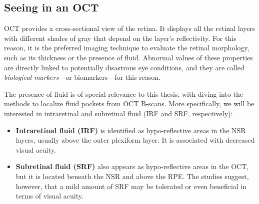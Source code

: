 
\subsection{Seeing in an OCT}
OCT provides a cross-sectional view of the retina. It displays all the retinal layers with different shades of gray that depend on the layer's reflectivity. For this reason, it is the preferred imaging technique to evaluate the retinal morphology, such as its thickness or the presence of fluid. Abnormal values of these properties are directly linked to potentially disastrous eye conditions, and they are called \textit{biological markers}---or biomarkers---for this reason. 

The presence of fluid is of special relevance to this thesis, with  diving into the methods to localize fluid pockets from OCT B-scans. More specifically, we will be interested in intraretinal and subretinal fluid (IRF and SRF, respectively):
\begin{itemize}
    \item \textbf{Intraretinal fluid (IRF)} is identified as hypo-reflective areas in the NSR layers, usually above the outer plexiform layer. It is associated with decreased visual acuity.

    \item \textbf{Subretinal fluid (SRF)} also appears as hypo-reflective areas in the OCT, but it is located beneath the NSR and above the RPE. The studies suggest, however, that a mild amount of SRF may be tolerated or even beneficial in terms of visual acuity.  
\end{itemize}

